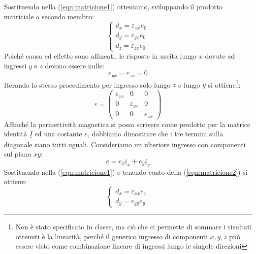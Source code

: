 \documentclass{book}
\begin{document}
            Sostituendo nella (\ref{eqn:matricione1}) otteniamo, sviluppando il prodotto matriciale a secondo membro:
            \begin{equation}
                \begin{cases}
                    d_{x} = \varepsilon_{xx} e_{0} \\
                    d_{y} = \varepsilon_{yx} e_{0} \\
                    d_{z} = \varepsilon_{zx} e_{0}
                \end{cases}
            \end{equation}
            Poiché causa ed effetto sono allineati, le risposte in uscita lungo $x$ dovute ad ingressi $y$ e $z$ devono essere nulle:
            \begin{equation}
                \varepsilon_{yx}=\varepsilon_{zx} = 0
            \end{equation}
            Iterando lo stesso procedimento per ingresso solo lungo $z$ e lungo $y$ si ottiene\footnote{Non è stato specificato in classe, ma ciò che ci permette di sommare i risultati ottenuti è la linearità, perché il generico ingresso di componenti $x,y,z$ può essere visto come combinazione lineare di ingressi lungo le singole direzioni}:
            \begin{equation}
            \label{eqn:matricione2}
                \underline{\underline{\varepsilon}} = \begin{pmatrix}
                    \varepsilon_{xx} & 0 & 0 \\
                    0 & \varepsilon_{yx} & 0 \\
                    0 & 0 & \varepsilon_{zx}
                \end{pmatrix}
            \end{equation}
            Affinché la permettività magnetica si possa scrivere come prodotto per la matrice identità $\underline{\underline{I}}$ ed una costante $\varepsilon$, dobbiamo dimostrare che i tre termini sulla diagonale siano tutti uguali. Consideriamo un ulteriore ingresso con componenti sul piano $xy$:
            \begin{equation}
                \underline{e} = e_{x}\underline{i}_{x}+e_{y}\underline{i}_{y}
            \end{equation}
            Sostituendo nella (\ref{eqn:matricione1}) e tenendo conto della (\ref{eqn:matricione2}) si ottiene:
            \begin{equation}
                \begin{cases}
                    d_{x} = \varepsilon_{xx}e_{x} \\
                    d_{y} = \varepsilon_{yy}e_{y}
                \end{cases}
            \end{equation}
\end{document}
